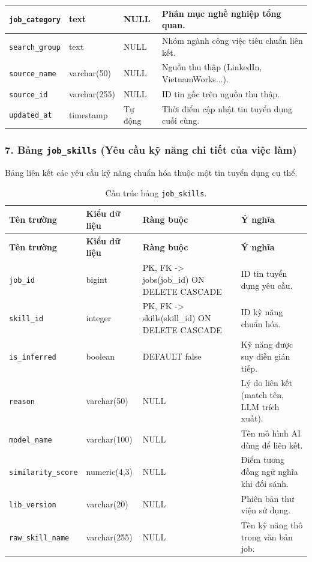 \begin{footnotesize}
\begin{longtable}{|L{3.5cm}|L{2.0cm}|L{3.0cm}|L{5.5cm}|}
\hline
\texttt{job\_\allowbreak category} & text & NULL & Phân mục nghề nghiệp tổng quan. \\
\hline
\texttt{search\_\allowbreak group} & text & NULL & Nhóm ngành công việc tiêu chuẩn liên kết. \\
\hline
\texttt{source\_name} & varchar(50) & NULL & Nguồn thu thập (LinkedIn, VietnamWorks...). \\
\hline
\texttt{source\_id} & varchar(255) & NULL & ID tin gốc trên nguồn thu thập. \\
\hline
\texttt{updated\_at} & timestamp & Tự động & Thời điểm cập nhật tin tuyển dụng cuối cùng. \\
\hline
\end{longtable}
\end{footnotesize}

\subsubsection*{7. Bảng \texttt{job\_skills} (Yêu cầu kỹ năng chi tiết của việc làm)}

Bảng liên kết các yêu cầu kỹ năng chuẩn hóa thuộc một tin tuyển dụng cụ thể.

\begin{footnotesize}\begin{longtable}{|L{3.5cm}|L{2.0cm}|L{3.0cm}|L{5.5cm}|}
\caption{Cấu trúc bảng \texttt{job\_skills}.}
\label{tab:job_skills} \\
\hline
\textbf{Tên trường} & \textbf{Kiểu dữ liệu} & \textbf{Ràng buộc} & \textbf{Ý nghĩa} \\
\hline
\endfirsthead
\hline
\textbf{Tên trường} & \textbf{Kiểu dữ liệu} & \textbf{Ràng buộc} & \textbf{Ý nghĩa} \\
\hline
\endhead
\texttt{job\_id} & bigint & PK, FK -> jobs(job\_id) ON DELETE CASCADE & ID tin tuyển dụng yêu cầu. \\
\hline
\texttt{skill\_id} & integer & PK, FK -> skills(skill\_id) ON DELETE CASCADE & ID kỹ năng chuẩn hóa. \\
\hline
\texttt{is\_inferred} & boolean & DEFAULT false & Kỹ năng được suy diễn gián tiếp. \\
\hline
\texttt{reason} & varchar(50) & NULL & Lý do liên kết (match tên, LLM trích xuất). \\
\hline
\texttt{model\_name} & varchar(100) & NULL & Tên mô hình AI dùng để liên kết. \\
\hline
\texttt{similarity\_\allowbreak score} & numeric(4,3) & NULL & Điểm tương đồng ngữ nghĩa khi đối sánh. \\
\hline
\texttt{lib\_version} & varchar(20) & NULL & Phiên bản thư viện sử dụng. \\
\hline
\texttt{raw\_\allowbreak skill\_\allowbreak name} & varchar(255) & NULL & Tên kỹ năng thô trong văn bản job. \\
\hline
\end{longtable}
\end{footnotesize}

